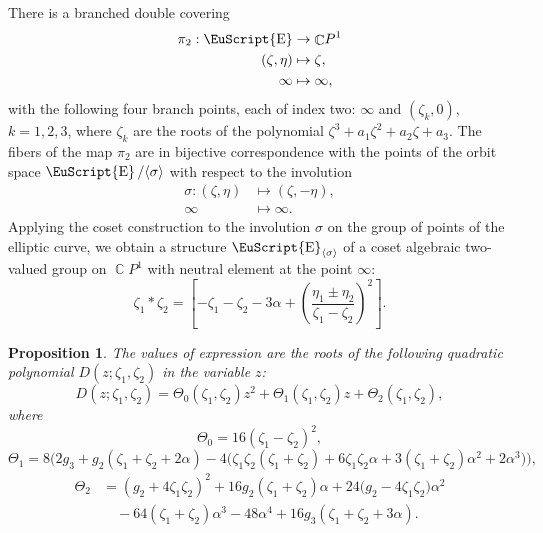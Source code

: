 \documentclass[14pt, dvipsnames]{extarticle}
\theoremstyle{plain}
\newtheorem{prop}{Proposition}
\theoremstyle{definition}
\theoremstyle{remark}
\DeclareMathOperator{\E}{\EuScript{E}}
\DeclareMathOperator{\Cc}{\mathbb{C}}
\begin{document}
There is a branched double covering
\begin{equation}\label{branched_covering}
\begin{aligned}
\pi_2:\E&\to \Cc\!P^1\\
(\zeta,\eta)&\mapsto \zeta,\\
\infty&\mapsto\infty,
\end{aligned}
\end{equation}
{with the following four branch points, each of index two: $\infty$ and $(\zeta_k, 0)$, $k=1,2,3$, where $\zeta_k$ are the roots of the polynomial $\zeta^3 + a_1\zeta^2 + a_2\zeta + a_3$.} The fibers of the map $\pi_2$ are in bijective correspondence with the points of the orbit space $\E/\langle \sigma \rangle$ with respect to the involution
\begin{equation*}
\begin{aligned}\label{involution_sigma}
\sigma:(\zeta,\eta)&\mapsto (\zeta,-\eta),\\
\infty&\mapsto \infty.
\end{aligned}
\end{equation*}
Applying the coset construction \cite[Theorem 1]{Buchstaber} to the involution $\sigma$ on the group of points of the elliptic curve, we obtain a structure $\E_{\langle\sigma \rangle}$ of a coset algebraic two-valued group on $\Cc\!P^1$ with neutral element at the point $\infty$:
\begin{equation}\label{x1_x2_2-valued}
\zeta_1 \ast \zeta_2 = \left [-\zeta_1 - \zeta_2 - 3\alpha + \left(\frac{\eta_1 \pm \eta_2}{\zeta_1 - \zeta_2}\right)^2\right ].
\end{equation}

\begin{prop}\label{lemma_1}
The values of expression {\normalfont{(\ref{x1_x2_2-valued})}} are the roots of the following quadratic polynomial $D(z; \zeta_1, \zeta_2)$ in the variable $z$:
\begin{equation}\label{D_polynomial}
D(z; \zeta_1, \zeta_2) = \Theta_0(\zeta_1, \zeta_2)z^2 + \Theta_1(\zeta_1, \zeta_2)z + \Theta_2(\zeta_1, \zeta_2),
\end{equation}
where
$$\Theta_0=16(\zeta_1-\zeta_2)^2,$$
$$\Theta_1=8\bigl(2g_3+g_2(\zeta_1+\zeta_2+2\alpha)-4\bigl(\zeta_1\zeta_2(\zeta_1+\zeta_2)+6\zeta_1\zeta_2\alpha+3(\zeta_1+\zeta_2)\alpha^2+2\alpha^3\bigr)\bigr),$$
$$
\begin{aligned}
\Theta_2&=(g_2+4\zeta_1\zeta_2)^2+16g_2(\zeta_1+\zeta_2)\alpha
+24\bigl(g_2-4\zeta_1\zeta_2\bigr)\alpha^2\\
&\quad-64(\zeta_1+\zeta_2)\alpha^3-48\alpha^4
+16g_3(\zeta_1+\zeta_2+3\alpha).
\end{aligned}
$$

\end{prop}
\end{document}
